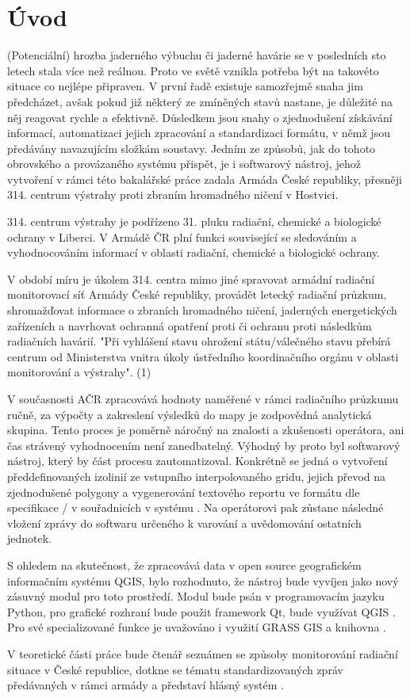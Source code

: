 \chapter{Úvod}
\label{1-uvod}

(Potenciální) hrozba jaderného výbuchu či jaderné havárie se v posledních sto letech stala více než reálnou. Proto ve světě vznikla potřeba být na takovéto situace co nejlépe připraven. V první řadě existuje samozřejmě snaha jim předcházet, avšak pokud již některý ze zmíněných stavů nastane, je důležité na něj reagovat rychle a efektivně. 
Důsledkem jsou snahy o zjednodušení získávání informací, automatizaci jejich zpracování a standardizaci formátu, v němž jsou předávány navazujícím složkám soustavy. Jedním ze způsobů, jak do tohoto obrovského a provázaného systému přispět, je i softwarový nástroj, jehož vytvoření v rámci této bakalářské práce zadala Armáda České republiky, přesněji 314. centrum výstrahy proti zbraním hromadného ničení v Hostvici.

314. centrum výstrahy  je podřízeno 31. pluku radiační, chemické a biologické ochrany v Liberci. V Armádě ČR plní funkci související se sledováním a vyhodnocováním informací v oblasti radiační, chemické a biologické ochrany.

V období míru je úkolem 314. centra mimo jiné spravovat armádní radiační monitorovací síť Armády České republiky, provádět letecký radiační průzkum, shromažďovat informace o zbraních hromadného ničení, jaderných energetických zařízeních a navrhovat ochranná opatření proti  či ochranu proti následkům radiačních havárií. "Při vyhlášení stavu ohrožení státu/válečného stavu přebírá centrum od Ministerstva vnitra úkoly ústředního koordinačního orgánu v oblasti monitorování a výstrahy". (1)

V současnosti AČR zpracovává hodnoty naměřené v rámci radiačního průzkumu ručně, za výpočty a zakreslení výsledků do mapy je zodpovědná analytická skupina. Tento proces je poměrně náročný na znalosti a zkušenosti operátora, ani čas strávený vyhodnocením není zanedbatelný. Výhodný by proto byl softwarový nástroj, který by část procesu zautomatizoval. Konkrétně se jedná o vytvoření předdefinovaných izolinií ze vstupního interpolovaného gridu, jejich převod na zjednodušené polygony a vygenerování textového reportu ve formátu dle specifikace / v souřadnicích v systému . Na operátorovi pak zůstane následné vložení zprávy do softwaru určeného k varování a uvědomování ostatních jednotek. 

S ohledem na skutečnost, že  zpracovává data v open source geografickém informačním systému QGIS, bylo rozhodnuto, že nástroj bude vyvíjen jako nový zásuvný modul pro toto prostředí. Modul bude psán v programovacím jazyku Python, pro grafické rozhraní bude použit framework Qt, bude využívat QGIS . Pro své specializované funkce je uvažováno i využití GRASS GIS  a knihovna . 

V teoretické části práce bude čtenář seznámen se způsoby monitorování radiační situace v České republice, dotkne se tématu standardizovaných zpráv předávaných v rámci armády a představí hlásný systém .
     
